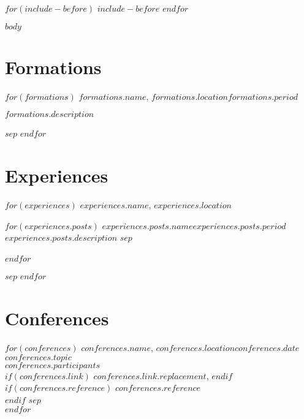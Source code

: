 \documentclass[
$if(fontsize)$
    $fontsize$,
$endif$
$if(lang)$
    $babel-lang$,
$endif$
$if(papersize)$
    $papersize$paper,
$endif$
$for(classoption)$
    $classoption$$sep$,
$endfor$
]{$documentclass$}
\newcommand{\mhref}[2]{\href{#2}{\texttt{#1}}}
\begin{document}
$for(include-before)$
    $include-before$
$endfor$

$body$

\section{Formations}
\footnotesize
\begin{adjustwidth}{3cm}{0cm}
    $for(formations)$
    \textbf{$formations.name$}, $formations.location$\hfill \textit{$formations.period$}
        \begin{adjustwidth}{0.6cm}{0cm}
            $formations.description$
        \end{adjustwidth}
        $sep$\vspace{0.8cm}
    $endfor$
\end{adjustwidth}

\section{Experiences}
\footnotesize
\begin{adjustwidth}{3cm}{0cm}
    $for(experiences)$
    \textbf{$experiences.name$}, $experiences.location$
        \begin{adjustwidth}{0.6cm}{0cm}
            $for(experiences.posts)$
                \textit{$experiences.posts.name$}\hfill \textit{$experiences.posts.period$}\\
                $experiences.posts.description$
                $sep$\\\\
            $endfor$
        \end{adjustwidth}
        $sep$\vspace{0.8cm}
    $endfor$
\end{adjustwidth}

\section{Conferences}
\footnotesize
\begin{adjustwidth}{3cm}{0cm}
    $for(conferences)$
    \textbf{$conferences.name$}, $conferences.location$\hfill \textit{$conferences.date$}\\
        $conferences.topic$\\
        \textit{$conferences.participants$}\\
        $if(conferences.link)$
            \mhref{$conferences.link.replacement$}{$conferences.link.url$},
        $endif$
        $if(conferences.reference)$
            $conferences.reference$\\
        $endif$
        $sep$\\
    $endfor$
\end{adjustwidth}
\end{document}

